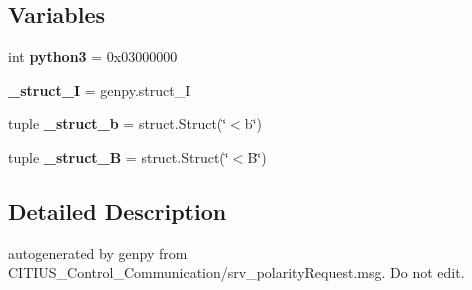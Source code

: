 \subsection*{\-Variables}
\begin{DoxyCompactItemize}
\item 
\hypertarget{namespace_c_i_t_i_u_s___control___communication_1_1srv_1_1__srv__polarity_a81dbcac6b6cac6c97c2441b6cc0e24ea}{int {\bfseries python3} = 0x03000000}\label{namespace_c_i_t_i_u_s___control___communication_1_1srv_1_1__srv__polarity_a81dbcac6b6cac6c97c2441b6cc0e24ea}

\item 
\hypertarget{namespace_c_i_t_i_u_s___control___communication_1_1srv_1_1__srv__polarity_a8835d8cf5598445cdfa7920ba3339bcc}{{\bfseries \-\_\-struct\-\_\-\-I} = genpy.\-struct\-\_\-\-I}\label{namespace_c_i_t_i_u_s___control___communication_1_1srv_1_1__srv__polarity_a8835d8cf5598445cdfa7920ba3339bcc}

\item 
\hypertarget{namespace_c_i_t_i_u_s___control___communication_1_1srv_1_1__srv__polarity_a6b6e57251d19f22116bdf12ef914890f}{tuple {\bfseries \-\_\-struct\-\_\-b} = struct.\-Struct(\char`\"{}$<$b\char`\"{})}\label{namespace_c_i_t_i_u_s___control___communication_1_1srv_1_1__srv__polarity_a6b6e57251d19f22116bdf12ef914890f}

\item 
\hypertarget{namespace_c_i_t_i_u_s___control___communication_1_1srv_1_1__srv__polarity_a8b41b0f2fe745c133416b9e5e1b09884}{tuple {\bfseries \-\_\-struct\-\_\-\-B} = struct.\-Struct(\char`\"{}$<$\-B\char`\"{})}\label{namespace_c_i_t_i_u_s___control___communication_1_1srv_1_1__srv__polarity_a8b41b0f2fe745c133416b9e5e1b09884}

\end{DoxyCompactItemize}


\subsection{\-Detailed \-Description}
\begin{DoxyVerb}autogenerated by genpy from CITIUS_Control_Communication/srv_polarityRequest.msg. Do not edit.\end{DoxyVerb}
 